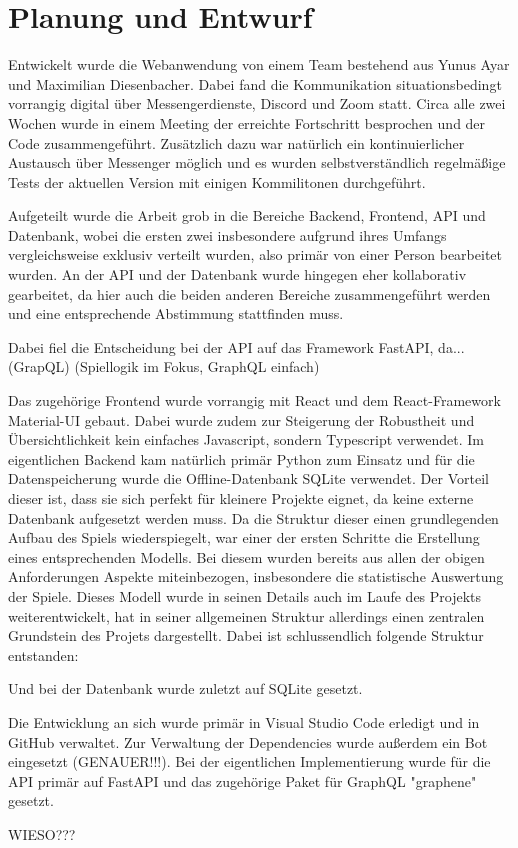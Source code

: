 \section{Planung und Entwurf}

Entwickelt wurde die Webanwendung von einem Team bestehend aus Yunus Ayar und Maximilian Diesenbacher. Dabei fand die Kommunikation situationsbedingt vorrangig digital über Messengerdienste, Discord und Zoom statt. Circa alle zwei Wochen wurde in einem Meeting der erreichte Fortschritt besprochen und der Code zusammengeführt. Zusätzlich dazu war natürlich ein kontinuierlicher Austausch über Messenger möglich und es wurden selbstverständlich regelmäßige Tests der aktuellen Version mit einigen Kommilitonen durchgeführt.

Aufgeteilt wurde die Arbeit grob in die Bereiche Backend, Frontend, API und Datenbank, wobei die ersten zwei insbesondere aufgrund ihres Umfangs vergleichsweise exklusiv verteilt wurden, also primär von einer Person bearbeitet wurden. An der API und der Datenbank wurde hingegen eher kollaborativ gearbeitet, da hier auch die beiden anderen Bereiche zusammengeführt werden und eine entsprechende Abstimmung stattfinden muss.

Dabei fiel die Entscheidung bei der API auf das Framework FastAPI, da...(GrapQL) (Spiellogik im Fokus, GraphQL einfach)

Das zugehörige Frontend wurde vorrangig mit React und dem React-Framework Material-UI gebaut. Dabei wurde zudem zur Steigerung der Robustheit und Übersichtlichkeit kein einfaches Javascript, sondern Typescript verwendet. Im eigentlichen Backend kam natürlich primär Python zum Einsatz und für die Datenspeicherung wurde die Offline-Datenbank SQLite verwendet. Der Vorteil dieser ist, dass sie sich perfekt für kleinere Projekte eignet, da keine externe Datenbank aufgesetzt werden muss. Da die Struktur dieser einen grundlegenden Aufbau des Spiels wiederspiegelt, war einer der ersten Schritte die Erstellung eines entsprechenden Modells. Bei diesem wurden bereits aus allen der obigen Anforderungen Aspekte miteinbezogen, insbesondere die statistische Auswertung der Spiele. Dieses Modell wurde in seinen Details auch im Laufe des Projekts weiterentwickelt, hat in seiner allgemeinen Struktur allerdings einen zentralen Grundstein des Projets dargestellt. Dabei ist schlussendlich folgende Struktur entstanden:

Und bei der Datenbank wurde zuletzt auf SQLite gesetzt. 

Die Entwicklung an sich wurde primär in Visual Studio Code erledigt und in GitHub verwaltet. Zur Verwaltung der Dependencies wurde außerdem ein Bot eingesetzt (GENAUER!!!). Bei der eigentlichen Implementierung wurde für die API primär auf FastAPI und das zugehörige Paket für GraphQL "graphene" gesetzt. 

WIESO??? 


